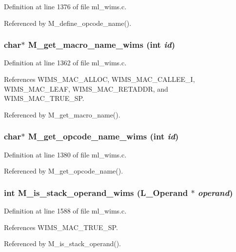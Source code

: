 Definition at line 1376 of file ml\_\-wims.c.

Referenced by M\_\-define\_\-opcode\_\-name().
\subsubsection{\setlength{\rightskip}{0pt plus 5cm}char$\ast$ M\_\-get\_\-macro\_\-name\_\-wims (int {\em id})}\label{m__wims_8h_05643ee355c8611bde56e54dff741120}




Definition at line 1362 of file ml\_\-wims.c.

References WIMS\_\-MAC\_\-ALLOC, WIMS\_\-MAC\_\-CALLEE\_\-I, WIMS\_\-MAC\_\-LEAF, WIMS\_\-MAC\_\-RETADDR, and WIMS\_\-MAC\_\-TRUE\_\-SP.

Referenced by M\_\-get\_\-macro\_\-name().
\subsubsection{\setlength{\rightskip}{0pt plus 5cm}char$\ast$ M\_\-get\_\-opcode\_\-name\_\-wims (int {\em id})}\label{m__wims_8h_2e7f9b86291d868dde6d7b542436a637}




Definition at line 1380 of file ml\_\-wims.c.

Referenced by M\_\-get\_\-opcode\_\-name().
\subsubsection{\setlength{\rightskip}{0pt plus 5cm}int M\_\-is\_\-stack\_\-operand\_\-wims (L\_\-Operand $\ast$ {\em operand})}\label{m__wims_8h_154f51f7c771b787904d21d3292aa29a}




Definition at line 1588 of file ml\_\-wims.c.

References WIMS\_\-MAC\_\-TRUE\_\-SP.

Referenced by M\_\-is\_\-stack\_\-operand().
